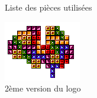 \documentclass{report}
\begin{document}
\begin{figure}[h!]
\begin{minipage}{.33\textwidth}
		\caption{Liste des pi\`{e}ces utilis\'{e}es}
		\label{fig:sub2}
	\end{minipage}
	\begin{minipage}{.33\textwidth}
		\centering
		\includegraphics[width=\linewidth]{Team_logo_001.png}
		\caption{2\`{e}me version du logo}
		\label{fig:sub2}
	\end{minipage}
\end{figure}
\newpage
\end{document}
